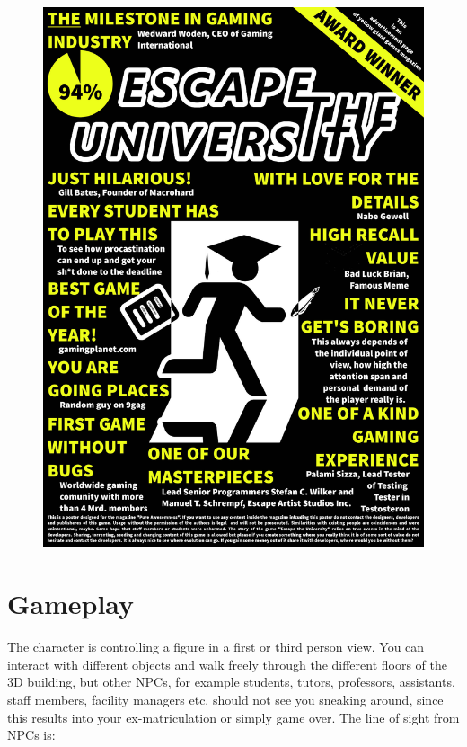 \documentclass[12pt]{article}
\begin{document}
\begin{multicols}{2}
		\begin{figure}[H]
		\includegraphics[width=1\columnwidth]{Images/poster.jpg}
	\end{figure}
\end{multicols}

\section*{Gameplay}

The character is controlling a figure in a first or third person view.
You can interact with different objects and walk freely through the different floors of the 3D building, but other NPCs, for example students, tutors, professors, assistants, staff members, facility managers etc. should not see you sneaking around, since this results into your ex-matriculation or simply game over.
The line of sight from NPCs is:
\end{document}
